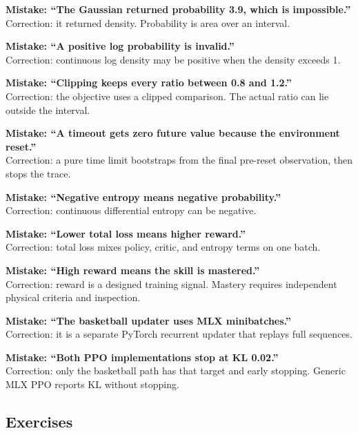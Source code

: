 \documentclass[
  american,
  11pt,
  letterpaper,
]{article}
\begin{document}
\textbf{Mistake: ``The Gaussian returned probability 3.9, which is
impossible.''}\\
Correction: it returned density. Probability is area over an interval.

\textbf{Mistake: ``A positive log probability is invalid.''}\\
Correction: continuous log density may be positive when the density
exceeds 1.

\textbf{Mistake: ``Clipping keeps every ratio between 0.8 and 1.2.''}\\
Correction: the objective uses a clipped comparison. The actual ratio
can lie outside the interval.

\textbf{Mistake: ``A timeout gets zero future value because the
environment reset.''}\\
Correction: a pure time limit bootstraps from the final pre-reset
observation, then stops the trace.

\textbf{Mistake: ``Negative entropy means negative probability.''}\\
Correction: continuous differential entropy can be negative.

\textbf{Mistake: ``Lower total loss means higher reward.''}\\
Correction: total loss mixes policy, critic, and entropy terms on one
batch.

\textbf{Mistake: ``High reward means the skill is mastered.''}\\
Correction: reward is a designed training signal. Mastery requires
independent physical criteria and inspection.

\textbf{Mistake: ``The basketball updater uses MLX minibatches.''}\\
Correction: it is a separate PyTorch recurrent updater that replays full
sequences.

\textbf{Mistake: ``Both PPO implementations stop at KL 0.02.''}\\
Correction: only the basketball path has that target and early stopping.
Generic MLX PPO reports KL without stopping.

\subsection{Exercises}\label{exercises}
\end{document}
